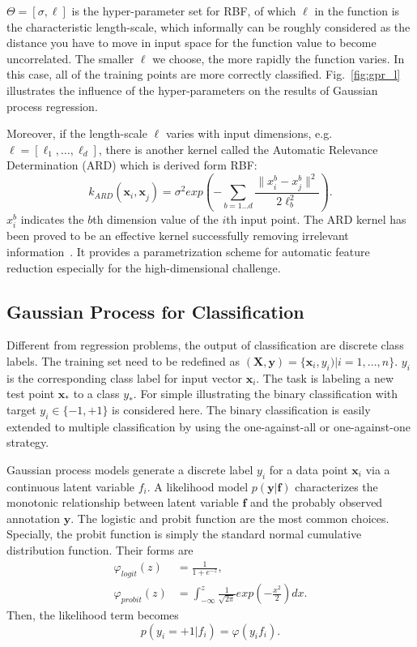 $\Theta = [\sigma,\ell]$ is the hyper-parameter set for RBF, of which $\ell$ in the function is
the characteristic length-scale, which informally can be roughly considered as the distance you
have to move in input space for the function value to become uncorrelated. The smaller $\ell$ we choose, the more rapidly the function varies. In this case, all of the training points are more correctly classified.  Fig.~\ref{fig:gpr_l} illustrates the influence of the hyper-parameters on the results of Gaussian process regression.

Moreover, if the length-scale $\ell$ varies with input dimensions, e.g.~$\mathbf{\ell} = [\ell_1,\ldots,\ell_d]$, there is another kernel called the Automatic Relevance Determination (ARD) which is derived form RBF:
\begin{equation}
	k_{ARD}(\mathbf{x}_i\mathbf{,x}_j) = \sigma^2 exp(-\sum\limits_{b=1\ldots d}\frac{\left.\|{x_i^b - x_j^b}\right.\| ^2}{2\ell_b^2}).
	\label{eq:ard}
\end{equation}
$x_i^b$ indicates the $b$th dimension value of the $i$th input point. The ARD kernel has been proved to be an effective kernel successfully removing irrelevant information~\cite{williams1996gaussian}. It provides a parametrization scheme for automatic feature reduction especially for the high-dimensional challenge.

\subsection{Gaussian Process for Classification}
\label{bg:gpc}
Different from regression problems, the output of classification are discrete class labels.
The training set need to be redefined as $(\mathbf{X},\mathbf{y})=\{\mathbf{x}_i,y_i)| i=1,...,n\}$. $y_i$ is the corresponding class label for input vector $\mathbf{x}_i$. The task is labeling a new test point $\mathbf{x}_*$ to a class $y_*$. For simple illustrating the binary classification with target $y_i \in \{-1,+1\}$ is considered here. The binary classification is easily extended to multiple classification by using the one-against-all or one-against-one strategy. 

Gaussian process models generate a discrete label $y_i$ for a data point $\mathbf{x}_i$ via a continuous latent variable $f_i$. A likelihood model $p(\mathbf{y}|\mathbf{f})$ characterizes the monotonic relationship between latent variable $\mathbf{f}$ and the probably observed annotation $\mathbf{y}$. The logistic and probit function are the most common choices. Specially, the probit function is simply the standard normal cumulative distribution function. Their forms are
\begin{align}
	\varphi_{logit}(z) &= \frac{1}{1+e^{-z}},\\
	\varphi_{probit}(z) &= \int_{-\infty}^z \frac{1}{\sqrt{2\pi}} exp(-\frac{x^2}{2}) dx.
\end{align}
Then, the likelihood term becomes
\begin{equation}
	p(y_i=+1|f_i) = \varphi (y_i f_i).
\end{equation}

